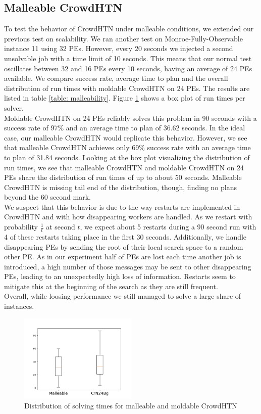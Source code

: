 \subsection{Malleable CrowdHTN}
\label{eval: malleable}
To test the behavior of CrowdHTN under malleable conditions, we extended our previous test on scalability. We ran another test on Monroe-Fully-Observable instance 11 using 32 PEs. However, every 20 seconds we injected a second unsolvable job with a time limit of 10 seconds. This means that our normal test oscillates between 32 and 16 PEs every 10 seconds, having an average of 24 PEs available. We compare success rate, average time to plan and the overall distribution of run times with moldable CrowdHTN on 24 PEs. The results are listed in table \ref{table: malleability}. Figure \ref{figure: malleability} shows a box plot of run times per solver. \\
Moldable CrowdHTN on 24 PEs reliably solves this problem in 90 seconds with a success rate of 97\% and an average time to plan of 36.62 seconds. In the ideal case, our malleable CrowdHTN would replicate this behavior. However, we see that malleable CrowdHTN achieves only 69\% success rate with an average time to plan of 31.84 seconds. Looking at the box plot visualizing the distribution of run times, we see that malleable CrowdHTN and moldable CrowdHTN on 24 PEs share the distribution of run times of up to about 50 seconds. Malleable CrowdHTN is missing tail end of the distribution, though, finding no plans beyond the 60 second mark. \\
We suspect that this behavior is due to the way restarts are implemented in CrowdHTN and with how disappearing workers are handled. As we restart with probability $\frac{1}{t}$ at second $t$, we expect about 5 restarts during a 90 second run with 4 of these restarts taking place in the first 30 seconds. Additionally, we handle disappearing PEs by sending the root of their local search space to a random other PE. As in our experiment half of PEs are lost each time another job is introduced, a high number of those messages may be sent to other disappearing PEs, leading to an unexpectedly high loss of information. Restarts seem to mitigate this at the beginning of the search as they are still frequent. \\
Overall, while loosing performance we still managed to solve a large share of instances.
\begin{figure}[!hbp]
	\caption{Distribution of solving times for malleable and moldable CrowdHTN}
	\label{figure: malleability}
	\centering
	\includegraphics[width=0.5\textwidth]{images/final/malleability}
\end{figure}
